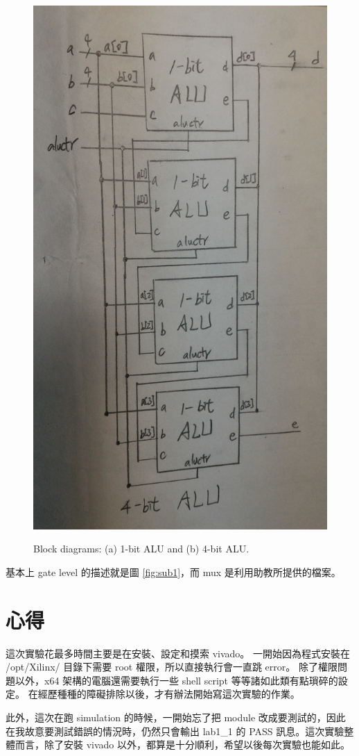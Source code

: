 \documentclass{article}
\begin{document}
\begin{CJK}{UTF8}{bsmi}
\begin{figure}[h]
{{    \includegraphics[width=.8\textwidth, angle=270]{4-bit-ALU}
  }
\hfill
}
\caption{Block diagrams: (a) 1-bit ALU and (b) 4-bit ALU.}
\end{figure}
基本上 gate level 的描述就是圖 \ref{fig:sub1}，而 mux 是利用助教所提供的檔案。
\section{心得}
這次實驗花最多時間主要是在安裝、設定和摸索 vivado。
一開始因為程式安裝在 /opt/Xilinx/ 目錄下需要 root 權限，所以直接執行會一直跳 error。
除了權限問題以外，x64 架構的電腦還需要執行一些 shell script 等等諸如此類有點瑣碎的設定。
在經歷種種的障礙排除以後，才有辦法開始寫這次實驗的作業。

此外，這次在跑 simulation 的時候，一開始忘了把 module 改成要測試的，因此在我故意要測試錯誤的情況時，仍然只會輸出 lab1\_1 的 PASS 訊息。這次實驗整體而言，除了安裝 vivado 以外，都算是十分順利，希望以後每次實驗也能如此。
\end{CJK}
\end{document}
